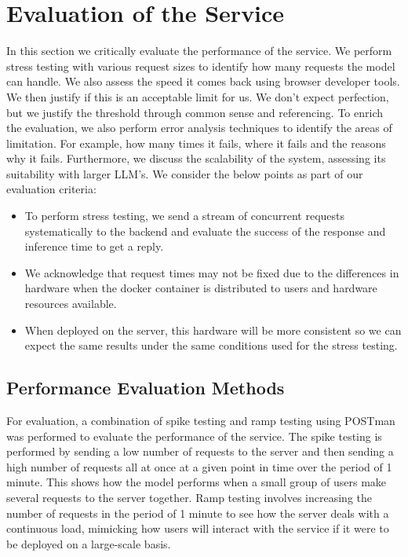 \documentclass{surreydissertation}
\begin{document}
\section{Evaluation of the Service}
In this section we critically evaluate the performance of the service. We perform stress testing with various request sizes to identify how many requests the model can handle. We also assess the speed it comes back using browser developer tools. We then justify if this is an acceptable limit for us. We don’t expect perfection, but we justify the threshold through common sense and referencing. To enrich the evaluation, we also perform error analysis techniques to identify the areas of limitation. For example, how many times it fails, where it fails and the reasons why it fails. Furthermore, we discuss the scalability of the system, assessing its suitability with larger LLM’s. We consider the below points as part of our evaluation criteria:

\begin{itemize}
    \item To perform stress testing, we send a stream of concurrent requests systematically to the backend and evaluate the success of the response and inference time to get a reply.
    \item We acknowledge that request times may not be fixed due to the differences in hardware when the docker container is distributed to users and hardware resources available.
    \item When deployed on the server, this hardware will be more consistent so we can expect the same results under the same conditions used for the stress testing.
\end{itemize}

\subsection{Performance Evaluation Methods}
For evaluation, a combination of spike testing and ramp testing using POSTman~\cite{postman} was performed to evaluate the performance of the service. The spike testing is performed by sending a low number of requests to the server and then sending a high number of requests all at once at a given point in time over the period of 1 minute. This shows how the model performs when a small group of users make several requests to the server together. Ramp testing involves increasing the number of requests in the period of 1 minute to see how the server deals with a continuous load, mimicking how users will interact with the service if it were to be deployed on a large-scale basis. 
\end{document}

